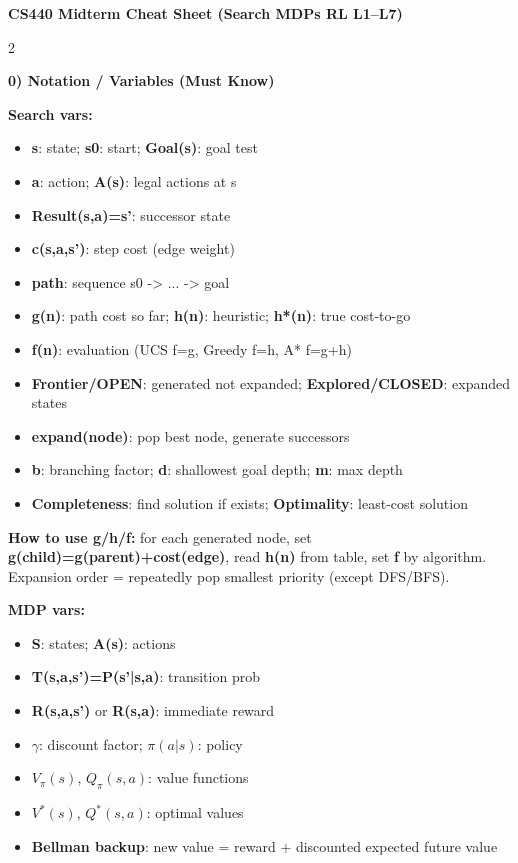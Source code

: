 \documentclass[10pt]{article}
\begin{document}
\scriptsize
\begin{center}
\textbf{CS440 Midterm Cheat Sheet (Search \textbullet{} MDPs \textbullet{} RL L1--L7)}
\end{center}

\begin{multicols*}{2}

\textbf{0) Notation / Variables (Must Know)}

\textbf{Search vars:}
\begin{itemize}
  \item \textbf{s}: state; \textbf{s0}: start; \textbf{Goal(s)}: goal test
  \item \textbf{a}: action; \textbf{A(s)}: legal actions at s
  \item \textbf{Result(s,a)=s'}: successor state
  \item \textbf{c(s,a,s')}: step cost (edge weight)
  \item \textbf{path}: sequence s0 -> ... -> goal
  \item \textbf{g(n)}: path cost so far; \textbf{h(n)}: heuristic; \textbf{h*(n)}: true cost-to-go
  \item \textbf{f(n)}: evaluation (UCS f=g, Greedy f=h, A* f=g+h)
  \item \textbf{Frontier/OPEN}: generated not expanded; \textbf{Explored/CLOSED}: expanded states
  \item \textbf{expand(node)}: pop best node, generate successors
  \item \textbf{b}: branching factor; \textbf{d}: shallowest goal depth; \textbf{m}: max depth
  \item \textbf{Completeness}: find solution if exists; \textbf{Optimality}: least-cost solution
\end{itemize}

\textbf{How to use g/h/f:} for each generated node, set
\textbf{g(child)=g(parent)+cost(edge)}, read \textbf{h(n)} from table, set \textbf{f} by algorithm.
Expansion order = repeatedly pop smallest priority (except DFS/BFS).

\textbf{MDP vars:}
\begin{itemize}
  \item \textbf{S}: states; \textbf{A(s)}: actions
  \item \textbf{T(s,a,s')=P(s'|s,a)}: transition prob
  \item \textbf{R(s,a,s')} or \textbf{R(s,a)}: immediate reward
  \item \textbf{$\gamma$}: discount factor; \textbf{$\pi(a|s)$}: policy
  \item \textbf{$V_{\pi}(s)$}, \textbf{$Q_{\pi}(s,a)$}: value functions
  \item \textbf{$V^*(s)$}, \textbf{$Q^*(s,a)$}: optimal values
  \item \textbf{Bellman backup}: new value = reward + discounted expected future value
\end{itemize}


\end{multicols*}
\end{document}

